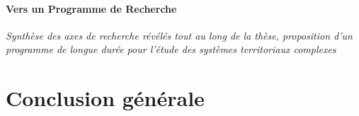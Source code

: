 
\paragraph{Vers un Programme de Recherche}

\textit{Synthèse des axes de recherche révélés tout au long de la thèse, proposition d'un programme de longue durée pour l'étude des systèmes territoriaux complexes}



\section*{Conclusion générale}




















